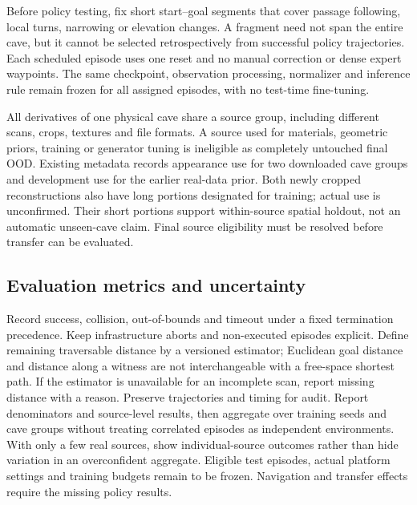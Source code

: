 Before policy testing, fix short start--goal segments that cover passage
following, local turns, narrowing or elevation changes. A fragment need not
span the entire cave, but it cannot be selected retrospectively from successful
policy trajectories. Each scheduled episode uses one reset and no manual
correction or dense expert waypoints. The same checkpoint, observation
processing, normalizer and inference rule remain frozen for all assigned
episodes, with no test-time fine-tuning.

All derivatives of one physical cave share a source group, including different
scans, crops, textures and file formats. A source used for materials, geometric
priors, training or generator tuning is ineligible as completely untouched
final OOD. Existing metadata records appearance use for two downloaded cave
groups and development use for the earlier real-data prior. Both newly cropped
reconstructions also have long portions designated for training; actual use
is unconfirmed. Their short portions support within-source spatial holdout,
not an automatic unseen-cave claim. Final source eligibility must be resolved
before transfer can be evaluated.

\subsection{Evaluation metrics and uncertainty}
Record success, collision, out-of-bounds and timeout under a fixed termination
precedence. Keep infrastructure aborts and non-executed episodes explicit.
Define remaining traversable distance by a versioned estimator; Euclidean
goal distance and distance along a witness are not interchangeable with a
free-space shortest path. If the estimator is unavailable for an incomplete
scan, report missing distance with a reason. Preserve trajectories and timing
for audit. Report denominators and source-level results, then aggregate over
training seeds and cave groups without treating correlated episodes as
independent environments. With only a few real sources, show individual-source
outcomes rather than hide variation in an overconfident aggregate.
Eligible test episodes, actual platform settings and training budgets remain
to be frozen. Navigation and transfer effects require the missing policy results.
